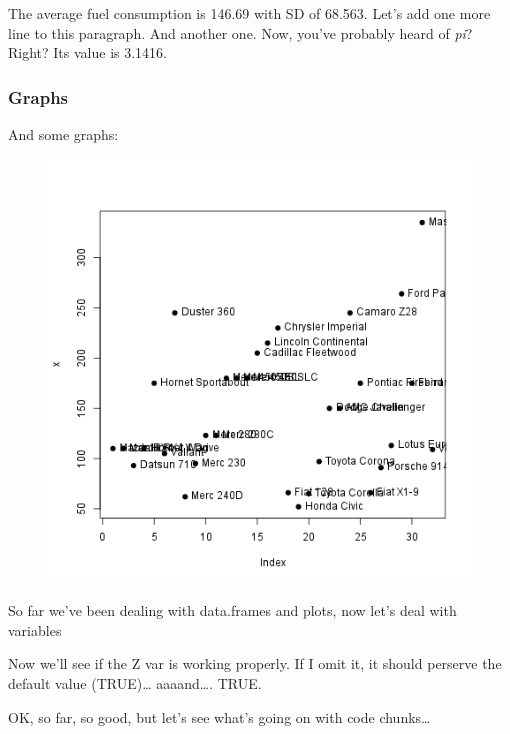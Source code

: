 \documentclass{article}
\makeatletter
\def\maxwidth{\ifdim\Gin@nat@width>\linewidth\linewidth
\else\Gin@nat@width\fi}
\let\Oldincludegraphics\includegraphics
\renewcommand{\includegraphics}[1]{\Oldincludegraphics[width=\maxwidth]{#1}}
\makeatother
\begin{document}
The average fuel consumption is 146.69 with SD of 68.563. Let's add one
more line to this paragraph. And another one. Now, you've probably heard
of \emph{pi}? Right? Its value is 3.1416.

\subsubsection{Graphs}

And some graphs:

\begin{figure}[htbp]
\centering
\includegraphics{0221aa97b1343432a8450115ebf9089f.png}
\caption{}
\end{figure}

So far we've been dealing with data.frames and plots, now let's deal
with variables

Now we'll see if the Z var is working properly. If I omit it, it should
perserve the default value (TRUE)\ldots{} aaaand\ldots{}. TRUE.

OK, so far, so good, but let's see what's going on with code
chunks\ldots{}
\end{document}
